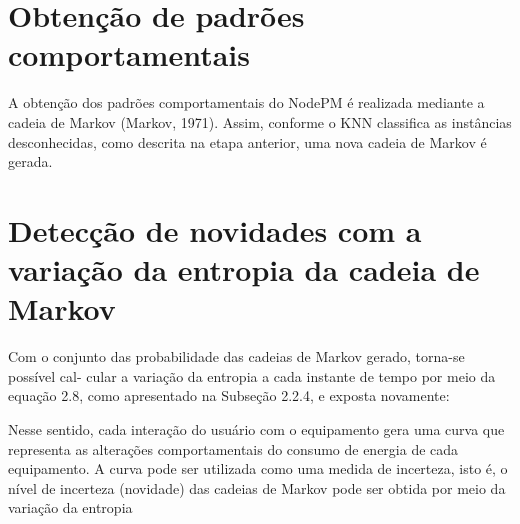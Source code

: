 \section{Obtenção de padrões comportamentais}

A obtenção dos padrões comportamentais do NodePM é realizada mediante a cadeia de Markov (Markov, 1971). Assim, conforme o KNN classifica as instâncias desconhecidas, como descrita na etapa anterior, uma nova cadeia de Markov é gerada. 

\section{Detecção de novidades com a variação da entropia da cadeia de Markov}
Com o conjunto das probabilidade das cadeias de Markov gerado, torna-se possível cal- cular a variação da entropia a cada instante de tempo por meio da equação 2.8, como apresentado na Subseção 2.2.4, e exposta novamente:

Nesse sentido, cada interação do usuário com o equipamento gera uma curva que
representa as alterações comportamentais do consumo de energia de cada equipamento. A curva pode ser utilizada como uma medida de incerteza, isto é, o nível de incerteza (novidade) das cadeias de Markov pode ser obtida por meio da variação da entropia